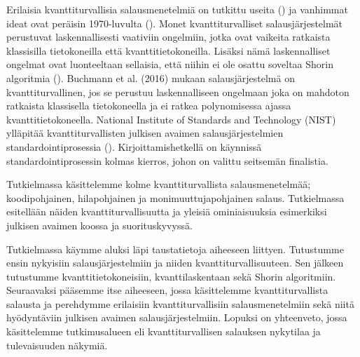 Erilaisia kvanttiturvallisia salausmenetelmiä on tutkittu useita (\cite{mavroeidis2018impact}) ja vanhimmat ideat ovat peräisin 1970-luvulta (\cite{repka2014overview}). Monet kvanttiturvalliset salausjärjestelmät perustuvat laskennallisesti vaativiin ongelmiin, jotka ovat vaikeita ratkaista klassisilla tietokoneilla että kvanttitietokoneilla. %
Lisäksi nämä laskennalliset ongelmat ovat luonteeltaan sellaisia, että niihin ei ole osattu soveltaa Shorin algoritmia (\cite{bernstein2017post}).
Buchmann et al. (2016) mukaan salausjärjestelmä on kvanttiturvallinen, jos se perustuu laskennalliseen ongelmaan joka on mahdoton ratkaista klassisella tietokoneella ja ei ratkea polynomisessa ajassa kvanttitietokoneella. National Institute of Standards and Technology (NIST) ylläpitää kvanttiturvallisten julkisen avaimen salausjärjestelmien standardointiprosessia (\cite{alagic2020status}). Kirjoittamishetkellä on käynnissä standardointiprosessin kolmas kierros, johon on valittu seitsemän finalistia. 

Tutkielmassa käsittelemme kolme kvanttiturvallista salausmenetelmää; koodipohjainen, hilapohjainen ja monimuuttujapohjainen salaus. Tutkielmassa esitellään näiden kvanttiturvallisuutta ja yleisiä ominiaisuuksia esimerkiksi julkisen avaimen koossa ja suorituskyvyssä.

Tutkielmassa käymme aluksi läpi taustatietoja aiheeseen liittyen. Tutustumme ensin nykyisiin salausjärjestelmiin ja niiden kvanttiturvallisuuteen. Sen jälkeen tutustumme kvanttitietokoneisiin, kvanttilaskentaan sekä Shorin algoritmiin. Seuraavaksi pääsemme itse aiheeseen, jossa käsittelemme kvanttiturvallista salausta ja perehdymme erilaisiin kvanttiturvallisiin salausmenetelmiin sekä niitä hyödyntäviin julkisen avaimen salausjärjestelmiin. Lopuksi on yhteenveto, jossa käsittelemme tutkimusalueen eli kvanttiturvallisen salauksen nykytilaa ja tulevaisuuden näkymiä.